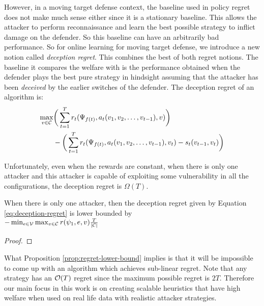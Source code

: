However, in a moving target defense context, the baseline used in policy regret does not make much sense either since it is a stationary baseline. This allows the attacker to perform reconnaissance and learn the best possible strategy to inflict damage on the defender. So this baseline can have an arbitrarily bad performance. So for online learning for moving target defense, we introduce a new notion called {\em deception regret}. This combines the best of both regret notions. The baseline it compares the welfare with is the performance obtained when the defender plays the best pure strategy in hindsight assuming that the attacker has been {\em deceived} by the earlier switches of the defender. The deception regret of an algorithm is:
\begin{align}
    \max_{v \in \cal C} & \bigg (\sum_{t=1}^T r_t(\Psi_{f(t)}, a_t(v_1, v_2, \dots, v_{t-1}), v) \bigg ) \\
    & - \bigg ( \sum_{t=1}^T r_t(\Psi_{f(t)}, a_t(v_1, v_2, \dots, v_{t-1}), v_t) - s_t(v_{t-1}, v_t) \bigg ) \label{eq:deception-regret}
\end{align}

Unfortunately, even when the rewards are constant, when there is only one attacker and this attacker is capable of exploiting some vulnerability in all the configurations, the deception regret is $\Omega (T)$.

\begin{proposition}\label{prop:regret-lower-bound}
When there is only one attacker, then the deception regret given by Equation \eqref{eq:deception-regret} is lower bounded by \\ $-\min_{e \in \cal V}\max_{v \in \cal C} r(\psi_1, e, v) \frac{T}{|\cal C|}$
\end{proposition}
\begin{proof}

\end{proof}

What Proposition \ref{prop:regret-lower-bound} implies is that it will be impossible to come up with an algorithm which achieves sub-linear regret. Note that any strategy has an $\cal O(T)$ regret since the maximum possible regret is $2T$. Therefore our main focus in this work is on creating scalable heuristics that have high welfare when used on real life data with realistic attacker strategies.